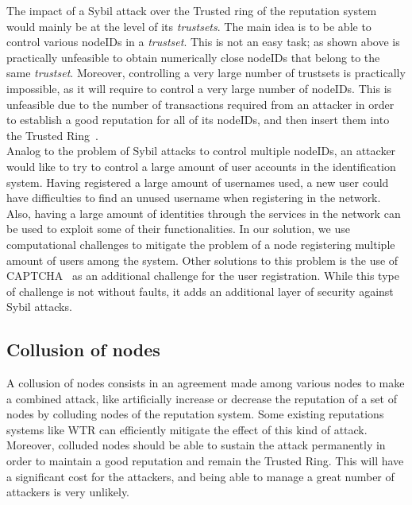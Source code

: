 The impact of a Sybil attack over the Trusted ring of the reputation system
would mainly be at the level of its \textit{trustsets}. The main idea is to be
able to control various nodeIDs in a \textit{trustset}. This is not an easy
task; as shown above is practically unfeasible to obtain numerically close
nodeIDs that belong to the same \textit{trustset}. Moreover, controlling a very
large number of trustsets is practically impossible, as it will require to
control a very large number of nodeIDs. This is unfeasible due to the number of
transactions required from an attacker in order to establish a good reputation
for all of its nodeIDs, and then insert them into the Trusted
Ring~\cite{rosas2011corps}.\\

Analog to the problem of Sybil attacks to control multiple nodeIDs, an attacker
would like to try to control a large amount of user accounts in the
identification system. Having registered a large amount of usernames used, a new
user could have difficulties to find an unused username when registering in the
network. Also, having a large amount of identities through the services in the
network can be used to exploit some of their functionalities.
In our solution, we use computational challenges to mitigate the problem of a
node registering multiple amount of users among the system. Other solutions to
this problem is the use of CAPTCHA~\cite{von2003captcha} as an additional
challenge for the user registration. While this type of challenge is not
without faults, it adds an additional layer of security against Sybil attacks.


\subsection{Collusion of nodes}

A collusion of nodes consists in an agreement made among various nodes to make
a combined attack, like artificially increase or decrease the reputation of a
set of nodes by colluding nodes of the reputation system. Some existing
reputations systems like WTR can efficiently mitigate the effect of this kind
of attack. Moreover, colluded nodes should be able to sustain the attack
permanently in order to maintain a good reputation and remain the Trusted Ring.
This will have a significant cost for the attackers, and being able to manage a
great number of attackers is very unlikely. 


